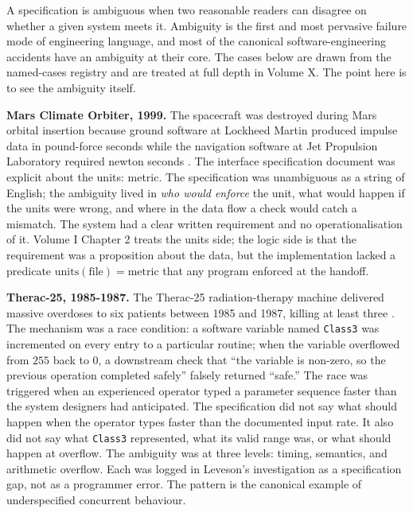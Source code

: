 A specification is ambiguous when two reasonable readers can disagree on whether a given system meets it. Ambiguity is the first and most pervasive failure mode of engineering language, and most of the canonical software-engineering accidents have an ambiguity at their core. The cases below are drawn from the named-cases registry and are treated at full depth in Volume X. The point here is to see the ambiguity itself.

\textbf{Mars Climate Orbiter, 1999.} The spacecraft was destroyed during Mars orbital insertion because ground software at Lockheed Martin produced impulse data in pound-force seconds while the navigation software at Jet Propulsion Laboratory required newton seconds \cite{acc:nasa-mco-mib}. The interface specification document was explicit about the units: metric. The specification was unambiguous as a string of English; the ambiguity lived in \emph{who would enforce} the unit, what would happen if the units were wrong, and where in the data flow a check would catch a mismatch. The system had a clear written requirement and no operationalisation of it. Volume I Chapter 2 treats the units side; the logic side is that the requirement was a proposition about the data, but the implementation lacked a predicate $\mathrm{units}(\mathrm{file}) = \mathrm{metric}$ that any program enforced at the handoff.

\textbf{Therac-25, 1985-1987.} The Therac-25 radiation-therapy machine delivered massive overdoses to six patients between 1985 and 1987, killing at least three \cite{paper:leveson-turner1993}. The mechanism was a race condition: a software variable named \texttt{Class3} was incremented on every entry to a particular routine; when the variable overflowed from $255$ back to $0$, a downstream check that ``the variable is non-zero, so the previous operation completed safely'' falsely returned ``safe.'' The race was triggered when an experienced operator typed a parameter sequence faster than the system designers had anticipated. The specification did not say what should happen when the operator types faster than the documented input rate. It also did not say what \texttt{Class3} represented, what its valid range was, or what should happen at overflow. The ambiguity was at three levels: timing, semantics, and arithmetic overflow. Each was logged in Leveson's investigation \cite{paper:leveson-turner1993} as a specification gap, not as a programmer error. The pattern is the canonical example of underspecified concurrent behaviour.

